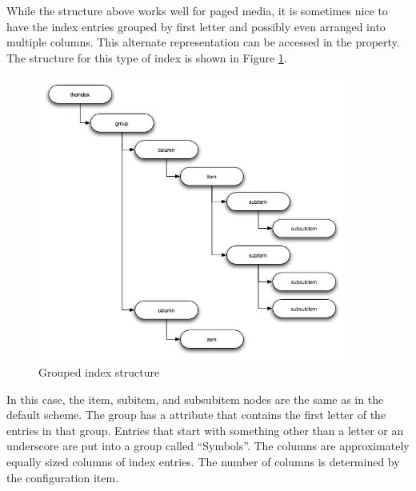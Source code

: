 While the structure above works well for paged media, it is sometimes 
nice to have the index entries grouped by first letter and possibly
even arranged into multiple columns.  This alternate representation
can be accessed in the  property.  The structure 
for this type of index is shown in Figure \ref{fig:groupedindex}.
\begin{figure}[ht]
\begin{center}
\includegraphics[width=4in]{groupedindex}
\end{center}
\caption{Grouped index structure\label{fig:groupedindex}}
\end{figure}

In this case, the item, subitem, and subsubitem nodes are the same as in
the default scheme.  The group has a  attribute that contains
the first letter of the entries in that group.  Entries that start with
something other than a letter or an underscore are put into a group
called ``Symbols''.  The columns are approximately equally sized columns
of index entries.  The number of columns is determined by the 
 configuration item.
